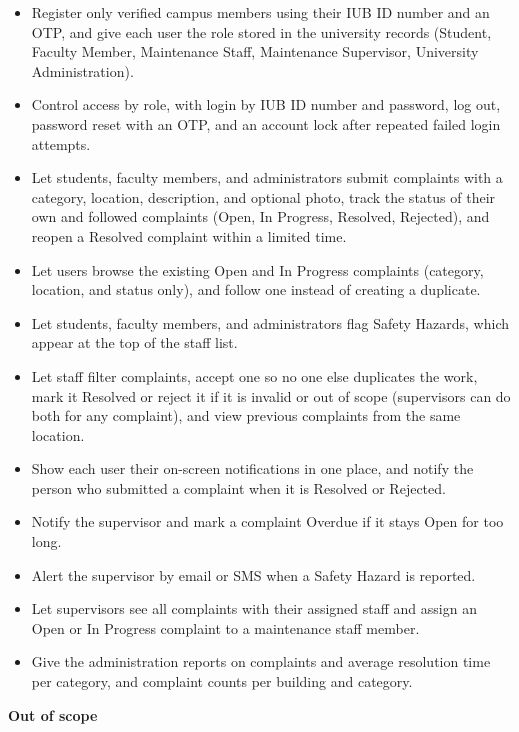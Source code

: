 \begin{itemize}
  \item Register only verified campus members using their IUB ID number and an OTP, and give each user the role stored in the university records (Student, Faculty Member, Maintenance Staff, Maintenance Supervisor, University Administration).
  \item Control access by role, with login by IUB ID number and password, log out, password reset with an OTP, and an account lock after repeated failed login attempts.
  \item Let students, faculty members, and administrators submit complaints with a category, location, description, and optional photo, track the status of their own and followed complaints (Open, In Progress, Resolved, Rejected), and reopen a Resolved complaint within a limited time.
  \item Let users browse the existing Open and In Progress complaints (category, location, and status only), and follow one instead of creating a duplicate.
  \item Let students, faculty members, and administrators flag Safety Hazards, which appear at the top of the staff list.
  \item Let staff filter complaints, accept one so no one else duplicates the work, mark it Resolved or reject it if it is invalid or out of scope (supervisors can do both for any complaint), and view previous complaints from the same location.
  \item Show each user their on-screen notifications in one place, and notify the person who submitted a complaint when it is Resolved or Rejected.
  \item Notify the supervisor and mark a complaint Overdue if it stays Open for too long.
  \item Alert the supervisor by email or SMS when a Safety Hazard is reported.
  \item Let supervisors see all complaints with their assigned staff and assign an Open or In Progress complaint to a maintenance staff member.
  \item Give the administration reports on complaints and average resolution time per category, and complaint counts per building and category.
\end{itemize}

\textbf{Out of scope}

